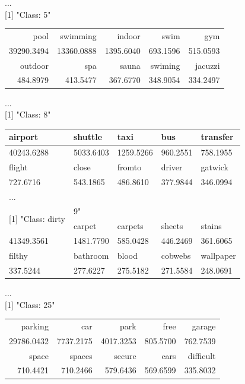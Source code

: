 \documentclass[10pt]{book}
\begin{document}
...\\[0pt]
[1] "Class: 5"

\begin{center}
\begin{tabular}{rrrrr}
pool & swimming & indoor & swim & gym \\
39290.3494 & 13360.0888 & 1395.6040 & 693.1596 & 515.0593 \\
outdoor & spa & sauna & swiming & jacuzzi \\
484.8979 & 413.5477 & 367.6770 & 348.9054 & 334.2497 \\
\end{tabular}
\end{center}

...\\[0pt]
[1] "Class: 8"

\begin{center}
\begin{tabular}{|l|l|l|l|l|}
\hline
airport & shuttle & taxi & bus & transfer \\
\hline
40243.6288 & 5033.6403 & 1259.5266 & 960.2551 & 758.1955 \\
\hline
flight & close & fromto & driver & gatwick \\
\hline
727.6716 & 543.1865 & 486.8610 & 377.9844 & 346.0994 \\
\hline
\multicolumn{5}{|l|}{...} \\
\hline
\multirow{2}{*}{[1] "Class: dirty} & \multicolumn{4}{|l|}{9"} \\
\hline
 & carpet & carpets & sheets & stains \\
\hline
41349.3561 & 1481.7790 & 585.0428 & 446.2469 & 361.6065 \\
\hline
filthy & bathroom & blood & cobwebs & wallpaper \\
\hline
337.5244 & 277.6227 & 275.5182 & 271.5584 & 248.0691 \\
\hline
\end{tabular}
\end{center}

...\\[0pt]
[1] "Class: 25"

\begin{center}
\begin{tabular}{rrrrr}
parking & car & park & free & garage \\
29786.0432 & 7737.2175 & 4017.3253 & 805.5700 & 762.7539 \\
space & spaces & secure & cars & difficult \\
710.4421 & 710.2466 & 579.6436 & 569.6599 & 335.8032 \\
\end{tabular}
\end{center}
\end{document}
